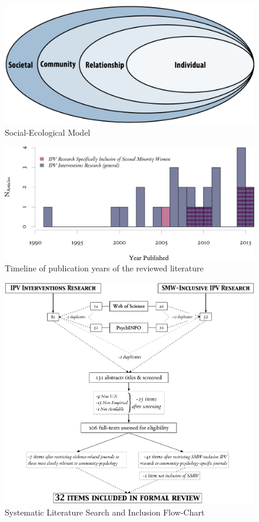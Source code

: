\documentclass[11pt,]{tufte-book}
\begin{document}
\begin{figure}
\centering
\includegraphics{graphics/inputs/sem.png}
\caption{Social-Ecological Model\label{fig:sem}}
\end{figure}

\newpage

\begin{figure}
\centering
\includegraphics{graphics/inputs/yrhist.png}
\caption{Timeline of publication years of the reviewed
literature\label{fig:yrhist}}
\end{figure}

\newpage

\begin{figure}
\centering
\includegraphics{graphics/inputs/flowchart.png}
\caption{Systematic Literature Search and Inclusion
Flow-Chart\label{fig:flowchart}}
\end{figure}
\end{document}
